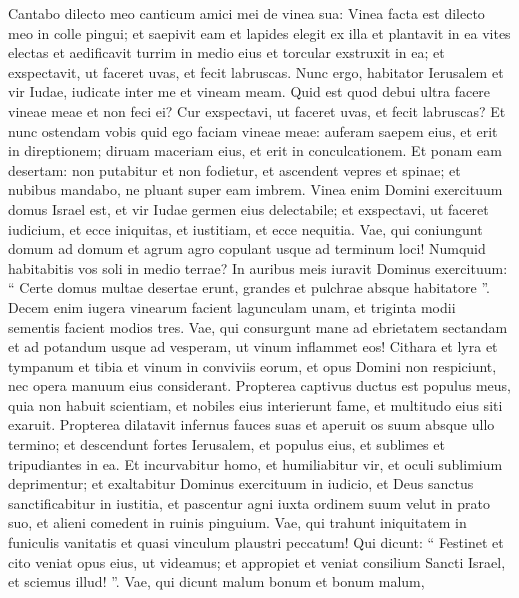 \begin{biblechapter}
\begin{biblechapter}
\begin{biblechapter}
\begin{biblechapter}
\begin{biblechapter}
\verse Cantabo dilecto meo
 canticum amici mei de vinea sua:
 Vinea facta est dilecto meo
 in colle pingui;
 \verse et saepivit eam
 et lapides elegit ex illa
 et plantavit in ea vites electas
 et aedificavit turrim in medio eius
 et torcular exstruxit in ea;
 et exspectavit, ut faceret uvas,
 et fecit labruscas.
 \verse Nunc ergo, habitator Ierusalem
 et vir Iudae,
 iudicate inter me et vineam meam.
 \verse Quid est quod debui ultra facere vineae meae
 et non feci ei?
 Cur exspectavi, ut faceret uvas,
 et fecit labruscas?
 \verse Et nunc ostendam vobis
 quid ego faciam vineae meae:
 auferam saepem eius,
 et erit in direptionem;
 diruam maceriam eius,
 et erit in conculcationem.
 \verse Et ponam eam desertam:
 non putabitur et non fodietur,
 et ascendent vepres et spinae;
 et nubibus mandabo, ne pluant super eam imbrem.
 \verse Vinea enim Domini exercituum domus Israel est,
 et vir Iudae germen eius delectabile;
 et exspectavi, ut faceret iudicium, et ecce iniquitas,
 et iustitiam, et ecce nequitia.
 \verse Vae, qui coniungunt domum ad domum
 et agrum agro copulant usque ad terminum loci!
 Numquid habitabitis vos soli in medio terrae?
 \verse In auribus meis iuravit Dominus exercituum:
 “ Certe domus multae desertae erunt,
 grandes et pulchrae absque habitatore ”.
 \verse Decem enim iugera vinearum facient lagunculam unam,
 et triginta modii sementis facient modios tres.
 \verse Vae, qui consurgunt mane ad ebrietatem sectandam
 et ad potandum usque ad vesperam,
 ut vinum inflammet eos!
 \verse Cithara et lyra
 et tympanum et tibia
 et vinum in conviviis eorum,
 et opus Domini non respiciunt,
 nec opera manuum eius considerant.
 \verse Propterea captivus ductus est populus meus,
 quia non habuit scientiam,
 et nobiles eius interierunt fame,
 et multitudo eius siti exaruit.
 \verse Propterea dilatavit infernus fauces suas
 et aperuit os suum absque ullo termino;
 et descendunt fortes Ierusalem, et populus eius,
 et sublimes et tripudiantes in ea.
 \verse Et incurvabitur homo, et humiliabitur vir,
 et oculi sublimium deprimentur;
 \verse et exaltabitur Dominus exercituum in iudicio,
 et Deus sanctus sanctificabitur in iustitia,
 \verse et pascentur agni iuxta ordinem suum velut in prato suo,
 et alieni comedent in ruinis pinguium.
 \verse Vae, qui trahunt iniquitatem in funiculis vanitatis
 et quasi vinculum plaustri peccatum!
 \verse Qui dicunt: “ Festinet
 et cito veniat opus eius, ut videamus;
 et appropiet et veniat consilium Sancti Israel,
 et sciemus illud! ”.
 \verse Vae, qui dicunt malum bonum et bonum malum,

\end{biblechapter}
\end{biblechapter}
\end{biblechapter}
\end{biblechapter}
\end{biblechapter}
